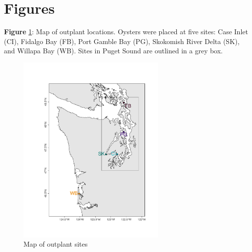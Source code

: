 \documentclass [11pt, proquest] {uwthesis}[2015/03/03]
\begin{document}
\hypertarget{figures}{%
\section{Figures}\label{figures}}

\textbf{Figure} \ref{fig:sitemap}: Map of outplant locations. Oysters were placed at five sites: Case Inlet (CI), Fidalgo Bay (FB), Port Gamble Bay (PG), Skokomish River Delta (SK), and Willapa Bay (WB). Sites in Puget Sound are outlined in a grey box.\newline
\begin{figure}[h]
\centering
  \includegraphics[width=0.65\textwidth]{figure/Ch1/fig1.1.pdf}
  \caption{Map of outplant sites}
  \label{fig:sitemap}
\end{figure}
\clearpage
\end{document}
